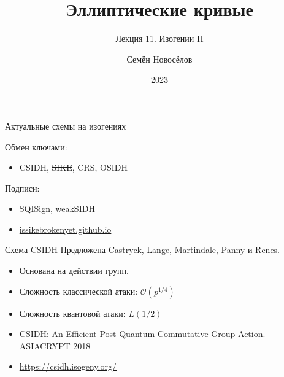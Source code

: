 \documentclass{beamer}
\title{Эллиптические кривые}
\subtitle{Лекция 11. Изогении II}
\author{Семён Новосёлов}
\institute{БФУ им. И. Канта}
\date{2023}
\begin{document}
\frame{\titlepage}

\newcommand{\UserA}{{\structure{{\Large\faUserSecret}}}}
\newcommand{\UserB}{{\structure{{\Large\faCat}}}}

\begin{frame}{Актуальные схемы на изогениях}

Обмен ключами:
\begin{itemize}
	\item CSIDH, \sout{SIKE}, CRS, OSIDH
\end{itemize}
\vspace{0.5em}

Подписи:
\begin{itemize}
	\item SQISign, weakSIDH
\end{itemize}

\vspace{0.5em}
\begin{itemize}
	\item[\structure{{\faGlobe}}] \href{https://issikebrokenyet.github.io/}{issikebrokenyet.github.io}
\end{itemize}
\end{frame}

\begin{frame}{Схема CSIDH}	
	Предложена Castryck, Lange, Martindale, Panny и  Renes.
	\vspace{0.5em}

	\begin{itemize}
		\item Основана на действии групп.
		\item Сложность классической атаки: $\mathcal{O}(p^{1/4})$
		\item Сложность квантовой атаки: $L(1/2)$
	\end{itemize}
	
	\vspace{1em}
	\begin{scriptsize}
		\begin{itemize}
			\item[\structure{\faBook}] CSIDH: An Efficient Post-Quantum Commutative Group Action. ASIACRYPT 2018
			\item[\structure{\faGlobe}] \url{https://csidh.isogeny.org/}
		\end{itemize}
	\end{scriptsize}
\end{frame}
\end{document}

